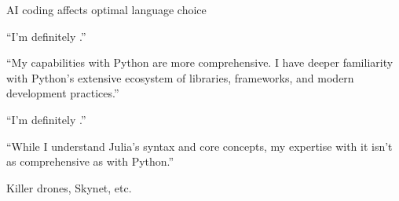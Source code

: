 \begin{frame}{AI coding affects optimal language choice}
    
    ``I'm definitely .''

    \vspace{0.5em}
    ``My capabilities with Python
    are more comprehensive. I have deeper familiarity with Python's extensive
    ecosystem of libraries, frameworks, and modern development practices.''

    \vspace{0.5em}
    ``I'm definitely .''

    \vspace{0.5em}
    ``While I understand Julia's syntax and core concepts, my expertise with it
    isn't as comprehensive as with Python.''

\end{frame}


\begin{frame}{Killer drones, Skynet, etc.}

    \begin{figure}
       \centering
    \end{figure}

\end{frame}


%     
%
%
%
%

